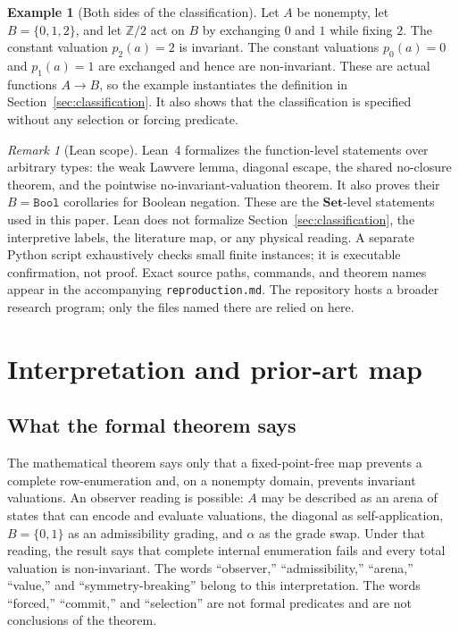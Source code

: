 \documentclass[11pt]{article}
\theoremstyle{definition}
\newtheorem{example}[theorem]{Example}
\theoremstyle{remark}
\newtheorem{remark}[theorem]{Remark}
\begin{document}
\begin{example}[Both sides of the classification]
\label{ex:classification}
Let $A$ be nonempty, let $B=\{0,1,2\}$, and let $\mathbb{Z}/2$ act on $B$ by exchanging $0$ and $1$ while fixing $2$. The constant valuation $p_2(a)=2$ is invariant. The constant valuations $p_0(a)=0$ and $p_1(a)=1$ are exchanged and hence are non-invariant. These are actual functions $A\to B$, so the example instantiates the definition in Section~\ref{sec:classification}. It also shows that the classification is specified without any selection or forcing predicate.
\end{example}

\begin{remark}[Lean scope]
\label{rem:machine}
Lean~4 formalizes the function-level statements over arbitrary types: the weak Lawvere lemma, diagonal escape, the shared no-closure theorem, and the pointwise no-invariant-valuation theorem. It also proves their $B=\texttt{Bool}$ corollaries for Boolean negation. These are the $\mathbf{Set}$-level statements used in this paper. Lean does not formalize Section~\ref{sec:classification}, the interpretive labels, the literature map, or any physical reading. A separate Python script exhaustively checks small finite instances; it is executable confirmation, not proof. Exact source paths, commands, and theorem names appear in the accompanying \texttt{reproduction.md}. The repository hosts a broader research program; only the files named there are relied on here.
\end{remark}

\section{Interpretation and prior-art map}
\label{sec:novelty}

\subsection{What the formal theorem says}

The mathematical theorem says only that a fixed-point-free map prevents a complete row-enumeration and, on a nonempty domain, prevents invariant valuations. An observer reading is possible: $A$ may be described as an arena of states that can encode and evaluate valuations, the diagonal as self-application, $B=\{0,1\}$ as an admissibility grading, and $\alpha$ as the grade swap. Under that reading, the result says that complete internal enumeration fails and every total valuation is non-invariant. The words ``observer,'' ``admissibility,'' ``arena,'' ``value,'' and ``symmetry-breaking'' belong to this interpretation. The words ``forced,'' ``commit,'' and ``selection'' are not formal predicates and are not conclusions of the theorem.
\end{document}
